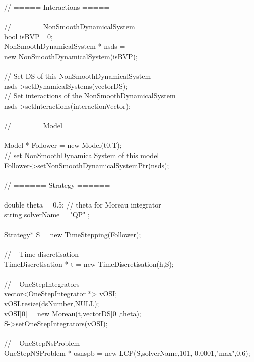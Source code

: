 \begin{tabbing}
 \> // ===== Interactions =====\\
\\
 \> // ===== NonSmoothDynamicalSystem =====\\

 \> bool isBVP =0;\\
 \> NonSmoothDynamicalSystem * nsds = \\
\>\>\>\> new NonSmoothDynamicalSystem(isBVP);\\
\\
 \>// Set DS of this NonSmoothDynamicalSystem\\
 \> nsds->setDynamicalSystems(vectorDS);       \\
 \> // Set interactions of the  NonSmoothDynamicalSystem\\
 \> nsds->setInteractions(interactionVector);  \\
\\
 \> // ===== Model =====\\
\\
 \> Model * Follower = new Model(t0,T);\\
 \> // set NonSmoothDynamicalSystem of this  model\\
 \> Follower->setNonSmoothDynamicalSystemPtr(nsds);\\
 \\
 \> // ====== Strategy ======\\
\\
 \> double theta = 0.5;  \>\>\>      // theta for Moreau integrator\\
 \> string solverName = "QP" ;\\
\\
 \> Strategy* S = new TimeStepping(Follower);\\
\\
 \> // -- Time discretisation --\\
 \> TimeDiscretisation * t = new TimeDiscretisation(h,S);\\
\\
 \> // -- OneStepIntegrators --\\
 \> vector<OneStepIntegrator *> vOSI;\\
 \> vOSI.resize(dsNumber,NULL);\\
 \> vOSI[0] = new Moreau(t,vectorDS[0],theta);\\
 \> S->setOneStepIntegrators(vOSI);\\
\\
 \> // -- OneStepNsProblem --\\
 \> OneStepNSProblem * osnspb = new LCP(S,solverName,101, 0.0001,"max",0.6);\\

\end{tabbing}
